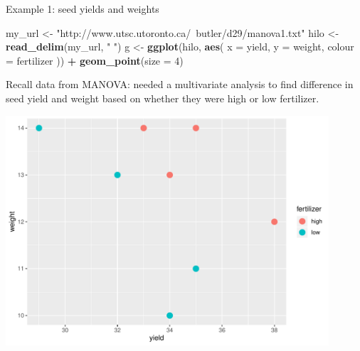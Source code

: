 \documentclass[ignorenonframetext,]{beamer}
\newenvironment{Shaded}{\begin{snugshade}}{\end{snugshade}}
\newcommand{\DataTypeTok}[1]{\textcolor[rgb]{0.13,0.29,0.53}{#1}}
\newcommand{\DecValTok}[1]{\textcolor[rgb]{0.00,0.00,0.81}{#1}}
\newcommand{\KeywordTok}[1]{\textcolor[rgb]{0.13,0.29,0.53}{\textbf{#1}}}
\newcommand{\NormalTok}[1]{#1}
\newcommand{\OperatorTok}[1]{\textcolor[rgb]{0.81,0.36,0.00}{\textbf{#1}}}
\newcommand{\StringTok}[1]{\textcolor[rgb]{0.31,0.60,0.02}{#1}}
\begin{document}
\begin{frame}[fragile]{Example 1: seed yields and weights}
\protect\hypertarget{example-1-seed-yields-and-weights}{}

\small

\begin{Shaded}
\begin{Highlighting}[]
\NormalTok{my_url <-}\StringTok{ "http://www.utsc.utoronto.ca/~butler/d29/manova1.txt"}
\NormalTok{hilo <-}\StringTok{ }\KeywordTok{read_delim}\NormalTok{(my_url, }\StringTok{" "}\NormalTok{)}
\NormalTok{g <-}\StringTok{ }\KeywordTok{ggplot}\NormalTok{(hilo, }\KeywordTok{aes}\NormalTok{(}
  \DataTypeTok{x =}\NormalTok{ yield, }\DataTypeTok{y =}\NormalTok{ weight,}
  \DataTypeTok{colour =}\NormalTok{ fertilizer}
\NormalTok{)) }\OperatorTok{+}\StringTok{ }\KeywordTok{geom_point}\NormalTok{(}\DataTypeTok{size =} \DecValTok{4}\NormalTok{)}
\end{Highlighting}
\end{Shaded}

\normalsize

\begin{minipage}[t]{0.38\linewidth}
\vspace{0.1\textheight}
Recall data from MANOVA: needed a multivariate analysis to find
difference in seed yield and weight based on whether they were high
or low fertilizer.
\end{minipage}\hfill
\begin{minipage}[t][][b]{0.55\textwidth}
\includegraphics[width=0.9\textwidth, valign=t]{berzani}
\end{minipage}

\end{frame}
\end{document}
